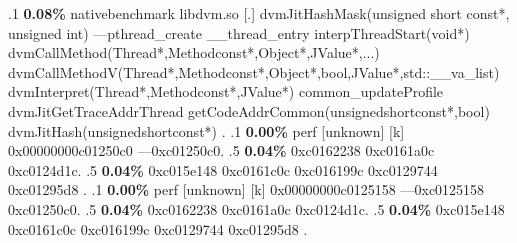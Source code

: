 \begin{profile}
{.1 \textbf{ 0.08\%} nativebenchmark  libdvm.so              [.] dvmJitHashMask(unsigned short const*, unsigned int)\newline {} ---pthread\_create\newline {} \_\_thread\_entry\newline {} interpThreadStart(void*)\newline {} dvmCallMethod(Thread*,Methodconst*,Object*,JValue*,...)\newline {} dvmCallMethodV(Thread*,Methodconst*,Object*,bool,JValue*,std::\_\_va\_list)\newline {} dvmInterpret(Thread*,Methodconst*,JValue*)\newline {} common\_updateProfile\newline {} dvmJitGetTraceAddrThread\newline {} getCodeAddrCommon(unsignedshortconst*,bool)\newline {} dvmJitHash(unsignedshortconst*)\newline {} . 
.1 \textbf{ 0.00\%} perf             [unknown]              [k] 0x00000000c01250c0\newline {} ---0xc01250c0. 
.5 \textbf{0.04\%} 0xc0162238\newline {} 0xc0161a0c\newline {} 0xc0124d1c. 
.5 \textbf{0.04\%} 0xc015e148\newline {} 0xc0161c0c\newline {} 0xc016199c\newline {} 0xc0129744\newline {} 0xc01295d8\newline {} . 
.1 \textbf{ 0.00\%} perf             [unknown]              [k] 0x00000000c0125158\newline {} ---0xc0125158\newline {} 0xc01250c0. 
.5 \textbf{0.04\%} 0xc0162238\newline {} 0xc0161a0c\newline {} 0xc0124d1c. 
.5 \textbf{0.04\%} 0xc015e148\newline {} 0xc0161c0c\newline {} 0xc016199c\newline {} 0xc0129744\newline {} 0xc01295d8\newline {} . 
}
\end{profile}
